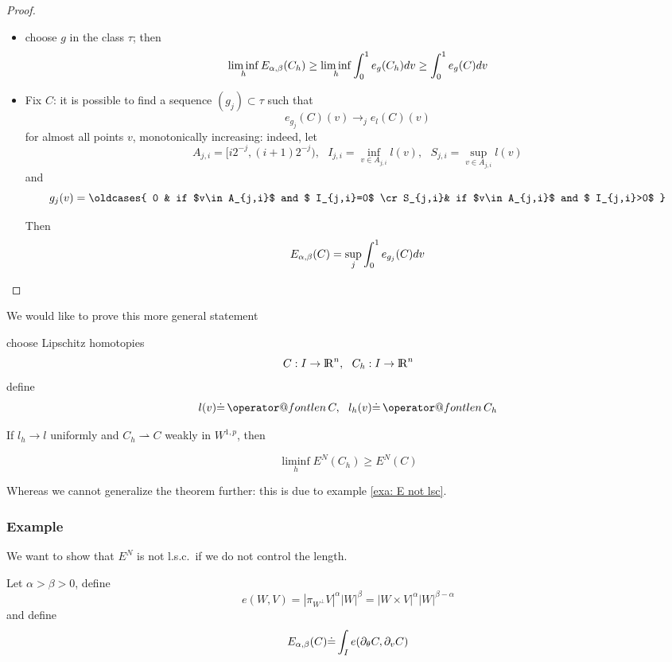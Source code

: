 \documentclass[twoside,a4paper,english]{article}
\makeatletter
\def\derpar#1{\partial_{#1}}
\def\wto{\rightharpoonup}
\def\len{\mathop{\operator@font len}\nolimits}
\makeatother
\begin{document}
\begin{proof}
\begin{itemize}
      Then for any such $g$ and $C\in \F$,
      \[ \int_0^1  e_{g}(C) dv \le E_{\a,\b}(C) ~~.\]
    \item 
      choose $g$ in the class $\tau$;      then
      \[ \liminf_h E_{\a,\b}(C_h) \ge\liminf_h  \int_0^1  e_{g}(C_h) dv
      \ge  \int_0^1  e_{g}(C) dv  \]

    \item 
      Fix $C$: it is possible to find a sequence $(g_j)\subset \tau$ 
      such that  
      \[ e_{g_j}(C)(v) \to_j e_l(C)(v) \]
      for almost all points  $v$, monotonically increasing: 
      indeed, let
      \[A_{j,i} = [i2^{-j},(i+1)2^{-j}), ~~~
      I_{j,i} = \inf_{v\in A_{j,i}} l(v),~~~
      S_{j,i} = \sup_{v\in A_{j,i}} l(v)\]
      and
      \[ g_j(v) = \oldcases {
        0 & if $v\in A_{j,i}$ and $ I_{j,i}=0$        \cr
        S_{j,i}& if $v\in A_{j,i}$ and $ I_{j,i}>0$       }\]

      Then 
      \[  E_{\a,\b}(C) = \sup_j  \int_0^1  e_{g_j}(C) dv      \]
    \end{itemize}
  \end{proof}


We would like to prove this more  general statement
\begin{Conjecture}\label{conj:sci}
 choose Lipschitz homotopies
  \[ C:I\to{\protect\mathrm{l\hskip-0.15em R}}^n, ~~ C_h:I\to{\protect\mathrm{l\hskip-0.15em R}}^n \]
  define
  \[ l(v) \defeq \len C, ~~ l_h(v) \defeq \len C_h   \]
  
  If $l_h\to l$    uniformly and
  $ C_h\wto C$ weakly in $W^{1,p}$,  then 
  
  \[ \liminf_h E^N (C_h) \ge E^N(C) \]
\end{Conjecture}

Whereas we cannot generalize the theorem
further: this is due to example \ref{exa: E not lsc}.

\endgroup





\subsubsection{Example}
\label{sec: tesselation}
We want to show that $E^N$ is not l.s.c.\ 
if we do not control the length.

\begingroup
\label{exa: E not lsc}
\def\a{\alpha}
\def\b{\beta}
\def\t{\theta}

Let $\a>\b>0$, define  
\[ e(W,V) = |\pi_{W^\perp}V |^\a |W|^\b = |W\times V|^\a |W|^{\b-\a} \]
and define
\[E_{\a,\b}(C) \defeq   \int_I e(\derpar\t C,\derpar v C) \] 
\end{document}
